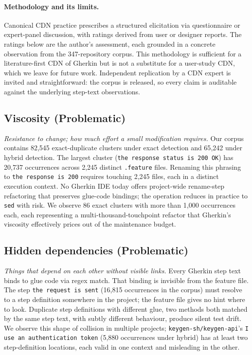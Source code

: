 \documentclass[11pt,a4paper]{article}
\begin{document}
\paragraph{Methodology and its limits.} Canonical CDN practice
\citep{blackwell2003cdn} prescribes a structured elicitation via
questionnaire or expert-panel discussion, with ratings derived from
user or designer reports. The ratings below are the author's
assessment, each grounded in a concrete observation from the
347-repository corpus. This methodology is sufficient for a
literature-first CDN of Gherkin but is not a substitute for a
user-study CDN, which we leave for future work. Independent replication
by a CDN expert is invited and straightforward: the corpus is released,
so every claim is auditable against the underlying step-text
observations.

\subsection{Viscosity (Problematic)}
\textit{Resistance to change; how much effort a small modification
requires.} Our corpus contains 82{,}545 exact-duplicate clusters
under exact detection and 65{,}242 under hybrid detection. The
largest cluster (\texttt{the response status is 200 OK}) has 20{,}737
occurrences across 2{,}245 distinct \texttt{.feature} files. Renaming
this phrasing to \texttt{the response is 200} requires touching 2{,}245
files, each in a distinct execution context. No Gherkin IDE today
offers project-wide rename-step refactoring that preserves glue-code
bindings; the operation reduces in practice to \texttt{sed}
with risk. We observe 86 exact clusters with more than 1{,}000
occurrences each, each representing a multi-thousand-touchpoint
refactor that Gherkin's viscosity effectively prices out of the
maintenance budget.

\subsection{Hidden dependencies (Problematic)}
\textit{Things that depend on each other without visible links.} Every
Gherkin step text binds to glue code via regex match. That binding
is invisible from the feature file. The step \texttt{the request is
sent} (16{,}815 occurrences in the corpus) must resolve to a step
definition somewhere in the project; the feature file gives no hint
where to look. Duplicate step definitions with different glue, two
methods both matched by the same step text, with subtly different
behaviour, produce silent test drift. We observe this shape of
collision in multiple projects; \texttt{keygen-sh/keygen-api}'s
\texttt{I use an authentication token} (5{,}880 occurrences under
hybrid) has at least two step-definition locations, each valid in
one context and misleading in the other.
\end{document}
